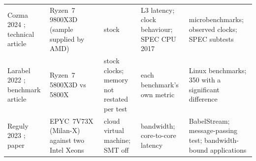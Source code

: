 \begin{table}[htbp]
\begin{tabularx}{\textwidth}{@{}>{\raggedright\arraybackslash}p{2.1cm}>{\raggedright\arraybackslash}p{3.0cm}>{\raggedright\arraybackslash}p{2.7cm}>{\raggedright\arraybackslash}p{2.1cm}>{\raggedright\arraybackslash}X@{}}
    Cozma 2024 \cite{cozmaAMDs9800X3D2nd2024}; technical article & Ryzen~7 9800X3D (sample supplied by AMD) & stock & L3 latency; clock behaviour; SPEC CPU 2017 & microbenchmarks; observed clocks; SPEC subtests \\
    Larabel 2022 \cite{larabelAMDRyzen72022}; benchmark article & Ryzen~7 5800X3D vs 5800X & stock clocks; memory not restated per test & each benchmark's own metric & 420 Linux benchmarks; 350 with a significant difference \\
    Reguly 2023 \cite{regulyComparativeEvaluationBandwidthbound2023}; paper & EPYC~7V73X (Milan-X) against two Intel Xeons & cloud virtual machine; SMT off & bandwidth; core-to-core latency & BabelStream; message-passing test; bandwidth-bound applications \\
    \bottomrule
  \end{tabularx}
\end{table}
